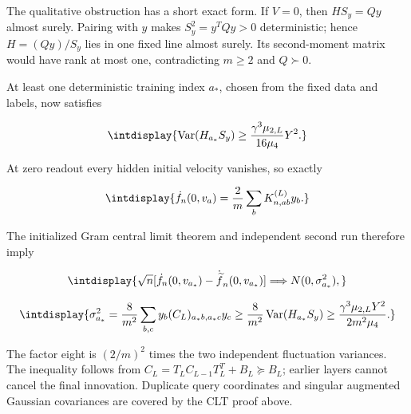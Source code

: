 
The qualitative obstruction has a short exact form. If \(V=0\), then \(HS_y=Qy\) almost surely. Pairing with \(y\) makes \(S_y^2=y^TQy>0\) deterministic; hence \(H=(Qy)/S_y\) lies in one fixed line almost surely. Its second-moment matrix would have rank at most one, contradicting \(m\ge2\) and \(Q\succ0\).



At least one deterministic training index \(a_*\), chosen from the fixed data and labels, now satisfies


\begingroup\renewcommand{\theHequation}{intdisplay.490}
\begin{equation*}
\intdisplay{
\operatorname{Var}(H_{a_*}S_y)
\ge\frac{\gamma^3\mu_{2,L}}{16\mu_4}Y^2.
}
\end{equation*}
\endgroup


At zero readout every hidden initial velocity vanishes, so exactly


\begingroup\renewcommand{\theHequation}{intdisplay.491}
\begin{equation*}
\intdisplay{
\dot f_n(0,v_a)=\frac2m\sum_b K_{n,ab}^{(L)}y_b.
}
\end{equation*}
\endgroup


The initialized Gram central limit theorem and independent second run therefore imply


\begingroup\renewcommand{\theHequation}{intdisplay.492}
\begin{equation*}
\intdisplay{
\sqrt n[\dot f_n(0,v_{a_*})-
\dot{\widetilde f}_n(0,v_{a_*})]
\Longrightarrow N(0,\sigma_{a_*}^2),
}
\end{equation*}
\endgroup

\begingroup\renewcommand{\theHequation}{intdisplay.493}
\begin{equation*}
\intdisplay{
\sigma_{a_*}^2=\frac8{m^2}\sum_{b,c}y_b(C_L)_{a_*b,a_*c}y_c
\ge\frac8{m^2}\operatorname{Var}(H_{a_*}S_y)
\ge\frac{\gamma^3\mu_{2,L}Y^2}{2m^2\mu_4}.
}
\end{equation*}
\endgroup


The factor eight is \((2/m)^2\) times the two independent fluctuation variances. The inequality follows from \(C_L=T_LC_{L-1}T_L^T+B_L\succeq B_L\); earlier layers cannot cancel the final innovation. Duplicate query coordinates and singular augmented Gaussian covariances are covered by the CLT proof above.


